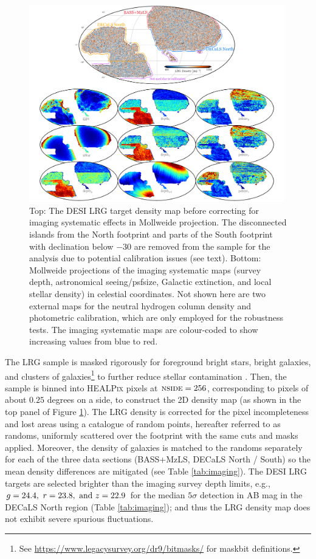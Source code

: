 \begin{figure}
 \centering
 \includegraphics[width=0.99\textwidth]{figures/dr9data.pdf}
 \caption{Top: The DESI LRG target density map before correcting for imaging systematic effects in Mollweide projection. The disconnected islands from the North footprint and parts of the South footprint with declination below $-30$ are removed from the sample for the analysis due to potential calibration issues (see text). Bottom: Mollweide projections of the imaging systematic maps (survey depth, astronomical seeing/psfsize, Galactic extinction, and local stellar density) in celestial coordinates. Not shown here are two external maps for the neutral hydrogen column density and photometric calibration, which are only employed for the robustness tests. The imaging systematic maps are colour-coded to show increasing values from blue to red.}
 \label{fig:ng}
\end{figure}

The LRG sample is masked rigorously for foreground bright stars, bright galaxies, and clusters of galaxies\footnote{See \url{https://www.legacysurvey.org/dr9/bitmasks/} for maskbit definitions.} to further reduce stellar contamination \citep{zhou2022target}. Then, the sample is binned into \textsc{HEALPix} \citep{gorski2005healpix} pixels at $\textsc{nside}=256$, corresponding to pixels of about $0.25$ degrees on a side, to construct the 2D density map (as shown in the top panel of Figure \ref{fig:ng}). The LRG density is corrected for the pixel incompleteness and lost areas using a catalogue of random points, hereafter referred to as randoms, uniformly scattered over the footprint with the same cuts and masks applied. Moreover, the density of galaxies is matched to the randoms separately for each of the three data sections (BASS+MzLS, DECaLS North / South) so the mean density differences are mitigated (see Table \ref{tab:imaging}). The DESI LRG targets are selected brighter than the imaging survey depth limits, e.g., $g=24.4,~r=23.8,~{\rm and}~z=22.9$ for the median $5\sigma$ detection in AB mag in the DECaLS North region (Table \ref{tab:imaging}); and thus the LRG density map does not exhibit severe spurious fluctuations.

